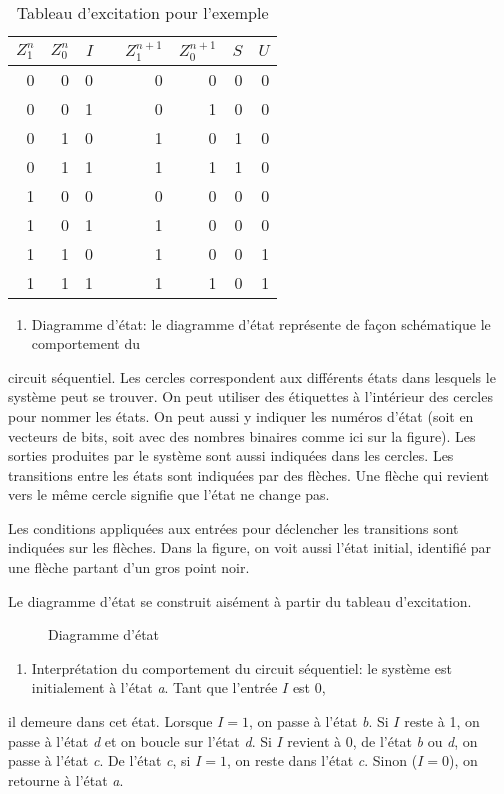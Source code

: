 \documentclass[letter, oneside]{book}
\begin{document}
\begin{table}[htbp]
\caption{\label{tab:org99da585}Tableau d'excitation pour l'exemple}
\centering
\begin{tabular}{rrrlrrrr}
\(Z_1^n\) & \(Z_0^n\) & \(I\) &  & \(Z_1^{n+1}\) & \(Z_0^{n+1}\) & \(S\) & \(U\)\\[0pt]
\hline
0 & 0 & 0 &  & 0 & 0 & 0 & 0\\[0pt]
0 & 0 & 1 &  & 0 & 1 & 0 & 0\\[0pt]
0 & 1 & 0 &  & 1 & 0 & 1 & 0\\[0pt]
0 & 1 & 1 &  & 1 & 1 & 1 & 0\\[0pt]
1 & 0 & 0 &  & 0 & 0 & 0 & 0\\[0pt]
1 & 0 & 1 &  & 1 & 0 & 0 & 0\\[0pt]
1 & 1 & 0 &  & 1 & 0 & 0 & 1\\[0pt]
1 & 1 & 1 &  & 1 & 1 & 0 & 1\\[0pt]
\end{tabular}
\end{table}

\begin{enumerate}
\item Diagramme d'état: le diagramme d'état représente de façon schématique le comportement du
\end{enumerate}
circuit séquentiel. Les cercles correspondent aux différents états
dans lesquels le système peut se trouver. On peut utiliser des
étiquettes à l'intérieur des cercles pour nommer les états. On peut
aussi y indiquer les numéros d'état (soit en vecteurs de bits, soit
avec des nombres binaires comme ici sur la figure). Les sorties
produites par le système sont aussi indiquées dans les cercles.  Les
transitions entre les états sont indiquées par des flèches. Une flèche
qui revient vers le même cercle signifie que l'état ne change pas.

Les conditions appliquées aux entrées pour déclencher les transitions
sont indiquées sur les flèches. Dans la figure, on voit aussi l'état
initial, identifié par une flèche partant d'un gros point noir.

Le diagramme d'état se construit aisément à partir du tableau
d'excitation.

\begin{figure}[htbp]
\centering

\caption{\label{fig:org5a03247}Diagramme d'état}
\end{figure}

\begin{enumerate}
\item Interprétation du comportement du circuit séquentiel: le système est initialement à l'état \emph{a}. Tant que l'entrée \(I\) est 0,
\end{enumerate}
il demeure dans cet état. Lorsque \(I=1\), on passe à l'état \emph{b}. Si
\(I\) reste à 1, on passe à l'état \emph{d} et on boucle sur l'état \emph{d}. Si
\(I\) revient à 0, de l'état \emph{b} ou \emph{d}, on passe à l'état \emph{c}. De l'état \emph{c},
si \(I = 1\), on reste dans l'état \emph{c}. Sinon (\(I = 0\)), on retourne à
l'état \emph{a}.
\end{document}
